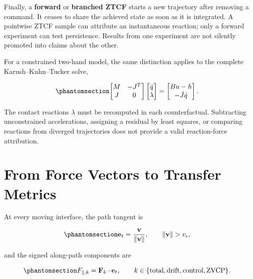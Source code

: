 \documentclass[
  letterpaper,
]{report}
\begin{document}
Finally, a \textbf{forward} or \textbf{branched ZTCF} starts a new
trajectory after removing a command. It ceases to share the achieved
state as soon as it is integrated. A pointwise ZTCF sample can attribute
an instantaneous reaction; only a forward experiment can test
persistence. Results from one experiment are not silently promoted into
claims about the other.

For a constrained two-hand model, the same distinction applies to the
complete Karush--Kuhn--Tucker solve,

\begin{equation}\phantomsection\label{eq-two-hand-kkt}{
\begin{bmatrix}M&-J^T\\J&0\end{bmatrix}
\begin{bmatrix}\ddot q\\\lambda\end{bmatrix}
=
\begin{bmatrix}Bu-h\\-\dot J\dot q\end{bmatrix}.
}\end{equation}

The contact reactions \(\lambda\) must be recomputed in each
counterfactual. Subtracting unconstrained accelerations, assigning a
residual by least squares, or comparing reactions from diverged
trajectories does not provide a valid reaction-force attribution.

\section{From Force Vectors to Transfer
Metrics}\label{sec-attribution-metrics}

At every moving interface, the path tangent is

\begin{equation}\phantomsection\label{eq-path-tangent}{
\mathbf e_t=\frac{\mathbf v}{\lVert\mathbf v\rVert},
\qquad \lVert\mathbf v\rVert>v_\epsilon,
}\end{equation}

and the signed along-path components are

\begin{equation}\phantomsection\label{eq-path-projection-components}{
F_{\parallel,k}=\mathbf F_k\cdot\mathbf e_t,
\qquad k\in\{\mathrm{total},\mathrm{drift},\mathrm{control},\mathrm{ZVCP}\}.
}\end{equation}
\end{document}
